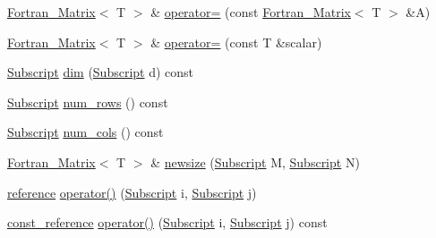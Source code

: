 \begin{DoxyCompactItemize}
\hyperlink{class_t_n_t_1_1_fortran___matrix}{Fortran\_\-Matrix}$<$ T $>$ \& \hyperlink{class_t_n_t_1_1_fortran___matrix_a69373cb3b722714961c1eee1fe6913c3}{operator=} (const \hyperlink{class_t_n_t_1_1_fortran___matrix}{Fortran\_\-Matrix}$<$ T $>$ \&A)
\item 
\hyperlink{class_t_n_t_1_1_fortran___matrix}{Fortran\_\-Matrix}$<$ T $>$ \& \hyperlink{class_t_n_t_1_1_fortran___matrix_a8a4e2eb49c40a9bffbacaa0ca454bf9e}{operator=} (const T \&scalar)
\item 
\hyperlink{namespace_t_n_t_af22e3f1460e145c04ce4e7d701e4c1c1}{Subscript} \hyperlink{class_t_n_t_1_1_fortran___matrix_a657aa46acd9b86c448f6645a7c93e264}{dim} (\hyperlink{namespace_t_n_t_af22e3f1460e145c04ce4e7d701e4c1c1}{Subscript} d) const 
\item 
\hyperlink{namespace_t_n_t_af22e3f1460e145c04ce4e7d701e4c1c1}{Subscript} \hyperlink{class_t_n_t_1_1_fortran___matrix_afcd994d21191603300bc1e227d7a272c}{num\_\-rows} () const 
\item 
\hyperlink{namespace_t_n_t_af22e3f1460e145c04ce4e7d701e4c1c1}{Subscript} \hyperlink{class_t_n_t_1_1_fortran___matrix_a2403966a53cd6172c080ffc8be0155ac}{num\_\-cols} () const 
\item 
\hyperlink{class_t_n_t_1_1_fortran___matrix}{Fortran\_\-Matrix}$<$ T $>$ \& \hyperlink{class_t_n_t_1_1_fortran___matrix_a52f3d9f0cd18cc7bf5da61b50eeec58c}{newsize} (\hyperlink{namespace_t_n_t_af22e3f1460e145c04ce4e7d701e4c1c1}{Subscript} M, \hyperlink{namespace_t_n_t_af22e3f1460e145c04ce4e7d701e4c1c1}{Subscript} N)
\item 
\hyperlink{class_t_n_t_1_1_fortran___matrix_a708e0a8fa61611d331137048c3006d5c}{reference} \hyperlink{class_t_n_t_1_1_fortran___matrix_affd3c1891e06b927a7e0f32ae2bb5e05}{operator()} (\hyperlink{namespace_t_n_t_af22e3f1460e145c04ce4e7d701e4c1c1}{Subscript} i, \hyperlink{namespace_t_n_t_af22e3f1460e145c04ce4e7d701e4c1c1}{Subscript} j)
\item 
\hyperlink{class_t_n_t_1_1_fortran___matrix_a78f281e015ad8409f1e5e70eea2a04a2}{const\_\-reference} \hyperlink{class_t_n_t_1_1_fortran___matrix_a8bdad47669a39bce899a1edd2bda12cd}{operator()} (\hyperlink{namespace_t_n_t_af22e3f1460e145c04ce4e7d701e4c1c1}{Subscript} i, \hyperlink{namespace_t_n_t_af22e3f1460e145c04ce4e7d701e4c1c1}{Subscript} j) const 
\end{DoxyCompactItemize}
